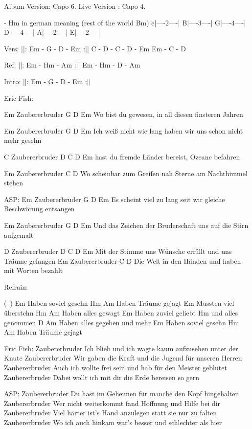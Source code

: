 Album Version: Capo 6.
Live Version : Capo 4.

- Hm in german meaning (rest of the world Bm)
e|----2----|
B|----3----|
G|----4----|
D|----4----|
A|----2----|
E|----2----|


Vers:  ||: Em - G - D - Em   :||
           C - D - C - D - Em
           Em - C - D

Ref:   ||: Em - Hm - Am      :||
           Em - Hm - D - Am


Intro: ||: Em - G - D - Em :||

Eric Fish:

Em
Zaubererbruder         G          D         Em
Wo bist du gewesen, in all diesen finsteren Jahren

Em
Zaubererbruder                G             D          Em
Ich weiß nicht wie lang haben wir uns schon nicht mehr gesehn

C
Zaubererbruder
     D                C           D     Em
hast du fremde Länder bereist, Ozeane befahren

Em
Zaubererbruder               C      D
Wo scheinbar zum Greifen nah Sterne am Nachthimmel stehen

ASP:
Em
Zaubererbruder                   G       D           Em
Es scheint viel zu lang seit wir gleiche Beschwörung entsangen

Em
Zaubererbruder                   G           D     Em
Und das Zeichen der Bruderschaft uns auf die Stirn aufgemalt

D
Zaubererbruder
D                          C               D      Em
Mit der Stimme uns Wünsche erfüllt und uns Träume gefangen
Em
Zaubererbruder             C                D
Die Welt in den Händen und haben mit Worten bezahlt

Refrain:

  (--)       Em
Haben soviel gesehn
               Hm   Am
Haben Träume gejagt
                 Em
Mussten viel überstehn
             Hm     Am
Haben alles gewagt
      Em
Haben zuviel geliebt
    Hm
und alles genommen
      D                 Am
Haben alles gegeben und mehr
             Em
Haben soviel gesehn
               Hm    Am
Haben Träume gejagt

Eric Fish:
Zaubererbruder
Ich blieb und ich wagte kaum aufzusehen unter der Knute
Zaubererbruder
Wir gaben die Kraft und die Jugend für unseren Herren
Zaubererbruder
Auch ich wollte frei sein und hab für den Meister geblutet
Zaubererbruder
Dabei wollt ich mit dir die Erde bereisen so gern

ASP:
Zaubererbruder
Du hast im Geheimen für manche den Kopf hingehalten
Zaubererbruder
Wer nicht weiterkommt fand Hoffnung und Hilfe bei dir
Zaubererbruder
Viel härter ist's Hand anzulegen statt sie nur zu falten
Zaubererbruder
Wo ich auch hinkam war's besser und schlechter als hier

